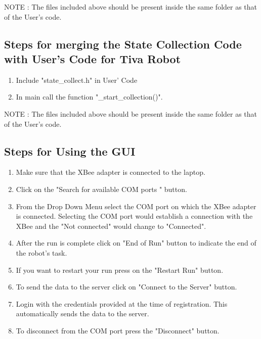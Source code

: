 \documentclass[a4paper,12pt,oneside]{book}
\begin{document}
NOTE : The files included above should be present inside the same folder as that of the User's code.

\subsection{Steps for merging the State Collection Code with User's Code for Tiva Robot}
\begin{enumerate}

\item Include "state\_collect.h" in User' Code

\item In main call the function  "\_start\_collection()".

\end{enumerate}


NOTE : The files included above should be present inside the same folder as that of the User's code.

\subsection{Steps for Using the GUI}
\begin{enumerate}

\item Make sure that the XBee adapter is connected to the laptop.
\item Click on the "Search for available COM ports " button.
\item From the Drop Down Menu select the COM port on which the XBee adapter is connected. Selecting the COM port would establish a connection with the XBee and the "Not connected" would change to "Connected".
\item After the run is complete click on "End of Run" button to indicate the end of the robot's task.
\item If you want to restart your run press on the "Restart Run" button.
\item To send the data to the server click on "Connect to the Server" button.
\item Login with the credentials provided at the time of registration. This automatically sends the data to the server. 
\item To disconnect from the COM port press the "Disconnect" button.

\end{enumerate}
\end{document}
